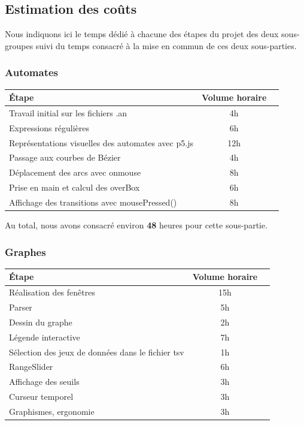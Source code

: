 
\subsection{Estimation des coûts}

Nous indiquons ici le temps dédié à chacune des étapes du projet des deux sous-groupes suivi du temps consacré à la mise en commun de ces deux sous-parties.

\subsubsection{Automates}

\begin{flushleft}
\begin{tabular}{|l|c|r|}
  \hline
   Étape & Volume horaire \\
  \hline
  Travail initial sur les fichiers .an & 4h \\
     \hline
  Expressions régulières & 6h \\
  \hline
  Représentations visuelles des automates avec p5.js & 12h\\
  \hline
    Passage aux courbes de Bézier & 4h \\
  \hline
    Déplacement des arcs avec onmouse & 8h\\
  \hline
   Prise en main et calcul des overBox  & 6h \\
  \hline
   Affichage des transitions avec mousePressed() & 8h \\
    \hline
 \end{tabular}
 \end{flushleft}

Au total, nous avons consacré environ \textbf{48} heures pour cette sous-partie. 

\subsubsection{Graphes}

\begin{flushleft}
\begin{tabular}{|l|c|r|}
  \hline
   Étape & Volume horaire \\
  \hline
  Réalisation des fenêtres & 15h \\
     \hline
  Parser & 5h \\
  \hline
  Dessin du graphe & 2h \\
  \hline
  Légende interactive & 7h \\
  \hline
  Sélection des jeux de données dans le fichier tsv & 1h \\
  \hline
  RangeSlider & 6h \\
  \hline
  Affichage des seuils & 3h \\
  \hline
  Curseur temporel & 3h \\
  \hline
  Graphismes, ergonomie & 3h\\
  \hline
  
 \end{tabular}
 \end{flushleft}

